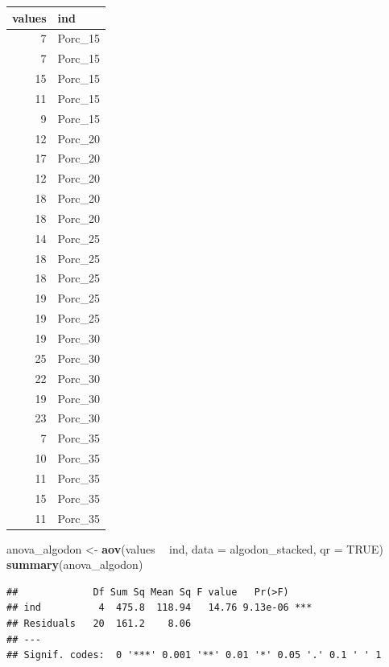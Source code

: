 \documentclass[]{article}
\newenvironment{Shaded}{\begin{snugshade}}{\end{snugshade}}
\newcommand{\KeywordTok}[1]{\textcolor[rgb]{0.13,0.29,0.53}{\textbf{#1}}}
\newcommand{\DataTypeTok}[1]{\textcolor[rgb]{0.13,0.29,0.53}{#1}}
\newcommand{\StringTok}[1]{\textcolor[rgb]{0.31,0.60,0.02}{#1}}
\newcommand{\OtherTok}[1]{\textcolor[rgb]{0.56,0.35,0.01}{#1}}
\newcommand{\OperatorTok}[1]{\textcolor[rgb]{0.81,0.36,0.00}{\textbf{#1}}}
\newcommand{\NormalTok}[1]{#1}
\begin{document}
\begin{tabular}{r|l}
\hline
values & ind\\
\hline
7 & Porc\_15\\
\hline
7 & Porc\_15\\
\hline
15 & Porc\_15\\
\hline
11 & Porc\_15\\
\hline
9 & Porc\_15\\
\hline
12 & Porc\_20\\
\hline
17 & Porc\_20\\
\hline
12 & Porc\_20\\
\hline
18 & Porc\_20\\
\hline
18 & Porc\_20\\
\hline
14 & Porc\_25\\
\hline
18 & Porc\_25\\
\hline
18 & Porc\_25\\
\hline
19 & Porc\_25\\
\hline
19 & Porc\_25\\
\hline
19 & Porc\_30\\
\hline
25 & Porc\_30\\
\hline
22 & Porc\_30\\
\hline
19 & Porc\_30\\
\hline
23 & Porc\_30\\
\hline
7 & Porc\_35\\
\hline
10 & Porc\_35\\
\hline
11 & Porc\_35\\
\hline
15 & Porc\_35\\
\hline
11 & Porc\_35\\
\hline
\end{tabular}

\begin{Shaded}
\begin{Highlighting}[]
\NormalTok{anova_algodon <-}\StringTok{ }\KeywordTok{aov}\NormalTok{(values }\OperatorTok{~}\StringTok{ }\NormalTok{ind, }\DataTypeTok{data =}\NormalTok{ algodon_stacked, }\DataTypeTok{qr =} \OtherTok{TRUE}\NormalTok{)}
\KeywordTok{summary}\NormalTok{(anova_algodon)}
\end{Highlighting}
\end{Shaded}

\begin{verbatim}
##             Df Sum Sq Mean Sq F value   Pr(>F)    
## ind          4  475.8  118.94   14.76 9.13e-06 ***
## Residuals   20  161.2    8.06                     
## ---
## Signif. codes:  0 '***' 0.001 '**' 0.01 '*' 0.05 '.' 0.1 ' ' 1
\end{verbatim}
\end{document}

